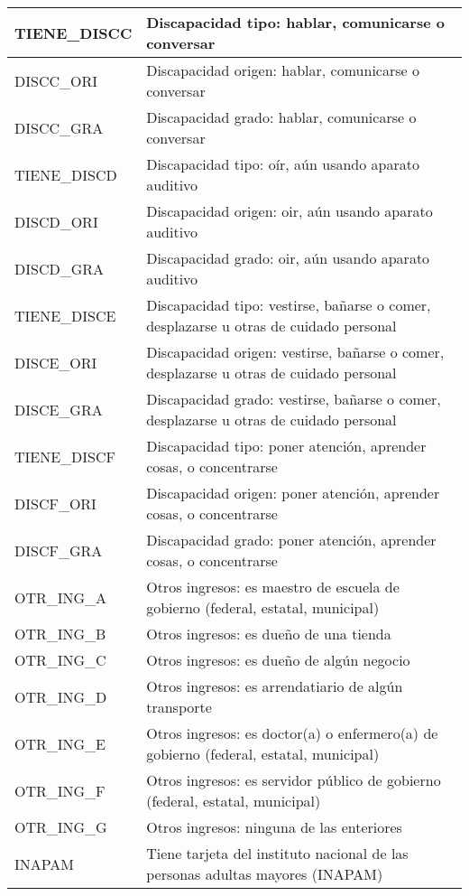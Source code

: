 \begin{longtable}{|p{8cm}|p{8cm}|}
    TIENE\_DISCC & Discapacidad tipo: hablar, comunicarse o conversar \\
    \hline
    DISCC\_ORI & Discapacidad origen: hablar, comunicarse o conversar \\
    \hline
    DISCC\_GRA & Discapacidad grado: hablar, comunicarse o conversar \\
    \hline
    TIENE\_DISCD & Discapacidad tipo: oír, aún usando aparato auditivo \\
    \hline
    DISCD\_ORI & Discapacidad origen: oir, aún usando aparato auditivo\\
    \hline
    DISCD\_GRA & Discapacidad grado: oir, aún usando aparato auditivo\\
    \hline
    TIENE\_DISCE & Discapacidad tipo: vestirse, bañarse o comer, desplazarse u otras de cuidado personal\\
    \hline
    DISCE\_ORI & Discapacidad origen: vestirse, bañarse o comer, desplazarse u otras de cuidado personal\\
    \hline
    DISCE\_GRA & Discapacidad grado: vestirse, bañarse o comer, desplazarse u otras de cuidado personal\\
    \hline
    TIENE\_DISCF & Discapacidad tipo: poner atención, aprender cosas, o concentrarse\\
    \hline
    DISCF\_ORI & Discapacidad origen: poner atención, aprender cosas, o concentrarse\\
    \hline
    DISCF\_GRA & Discapacidad grado: poner atención, aprender cosas, o concentrarse\\
    \hline
    OTR\_ING\_A & Otros ingresos: es maestro de escuela de gobierno (federal, estatal, municipal) \\
    \hline
    OTR\_ING\_B & Otros ingresos: es dueño de una tienda\\
    \hline
    OTR\_ING\_C & Otros ingresos: es dueño de algún negocio\\
    \hline
    OTR\_ING\_D & Otros ingresos: es arrendatiario de algún transporte\\
    \hline
    OTR\_ING\_E & Otros ingresos: es doctor(a) o enfermero(a) de gobierno (federal, estatal, municipal)\\
    \hline
    OTR\_ING\_F & Otros ingresos: es servidor público de gobierno (federal, estatal, municipal)\\
    \hline
    OTR\_ING\_G & Otros ingresos: ninguna de las enteriores\\
    \hline
    INAPAM & Tiene tarjeta del instituto nacional de las personas adultas mayores (INAPAM)\\

\end{longtable}
